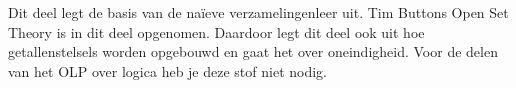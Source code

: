 \documentclass[../../include/open-logic-part]{subfiles}
\begin{document}

\begin{editorial}
  Dit deel legt de basis van de naïeve verzamelingenleer uit. Tim Buttons
  Open Set Theory is in dit deel opgenomen. Daardoor legt dit deel ook uit hoe
  getallenstelsels worden opgebouwd en gaat het over oneindigheid. Voor de
  delen van het OLP over logica heb je deze stof niet nodig.
\end{editorial}







\OLEndPartHook
\end{document}
